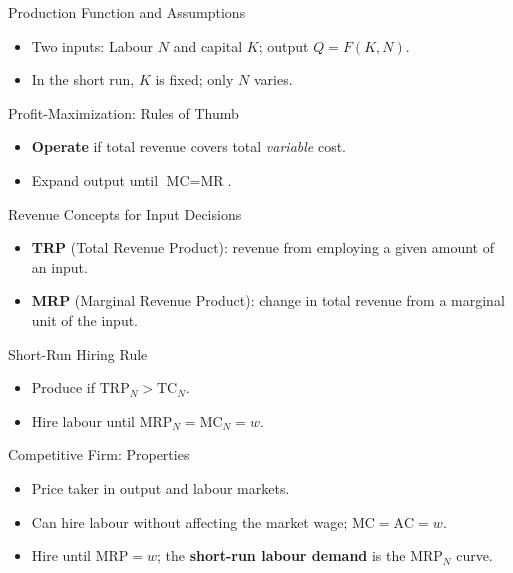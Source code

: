 \documentclass[aspectratio=169]{beamer}
\begin{document}
\begin{frame}{Production Function and Assumptions}
\transfade
\begin{itemize}
  \item Two inputs: Labour \(N\) and capital \(K\); output \(Q=F(K,N)\).
  \item In the short run, \(K\) is fixed; only \(N\) varies.
\end{itemize}
\end{frame}

\begin{frame}{Profit-Maximization: Rules of Thumb}
\transfade
\begin{itemize}
  \item \textbf{Operate} if total revenue covers total \emph{variable} cost.
  \item Expand output until \(\text{MC}=\text{MR}\).
\end{itemize}
\end{frame}

\begin{frame}{Revenue Concepts for Input Decisions}
\transfade
\begin{itemize}
  \item \textbf{TRP} (Total Revenue Product): revenue from employing a given amount of an input.
  \item \textbf{MRP} (Marginal Revenue Product): change in total revenue from a marginal unit of the input.
\end{itemize}
\end{frame}

\begin{frame}{Short-Run Hiring Rule}
\transfade
\begin{itemize}
  \item Produce if \(\text{TRP}_N > \text{TC}_N\).
  \item Hire labour until \(\text{MRP}_N = \text{MC}_N = w\).
\end{itemize}
\end{frame}

\begin{frame}{Competitive Firm: Properties}
\transfade
\begin{itemize}
  \item Price taker in output and labour markets.
  \item Can hire labour without affecting the market wage; \(\text{MC}=\text{AC}=w\).
  \item Hire until \(\text{MRP}=w\); the \textbf{short-run labour demand} is the \(\text{MRP}_N\) curve.
\end{itemize}
\end{frame}
\end{document}
